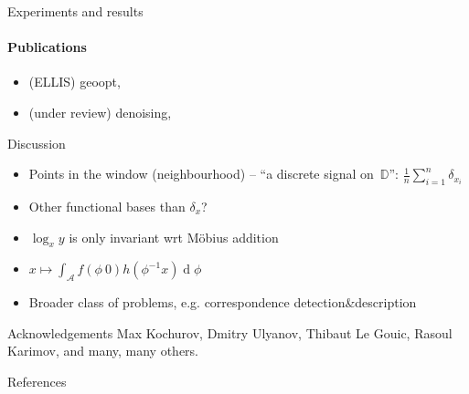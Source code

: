 \documentclass{beamer}
\begin{document}
\begin{frame}{Experiments and results}
    \framesubtitle{Publications}
    
    \begin{itemize}
        \item (ELLIS) geoopt,~\citet{geoopt}
        \item (under review) denoising,~\citet{denoisingAkhmedkhan}
    \end{itemize}
\end{frame}

\begin{frame}{Discussion}
    \begin{itemize}
        \item Points in the window (neighbourhood) -- ``a discrete signal on~\( \mathbb{D} \)'':
            \( \frac1n \sum_{i=1}^n \delta_{x_i} \)
        \item Other functional bases than \( \delta_x \)?
        \item \( \log_xy \) is only invariant wrt M\"obius addition
        \item \(x\mapsto \int_{\mathcal{A}} f(\phi~0) h(\phi^{-1}x) \operatorname{d}\phi \)
        \item Broader class of problems, e.g. correspondence detection\&description
    \end{itemize}
\end{frame}

\begin{frame}{Acknowledgements}
    Max Kochurov, Dmitry Ulyanov, Thibaut Le Gouic, Rasoul Karimov, and many,
    many others.
\end{frame}

\begin{frame}{References}
    \printbibliography
\end{frame}
\end{document}
